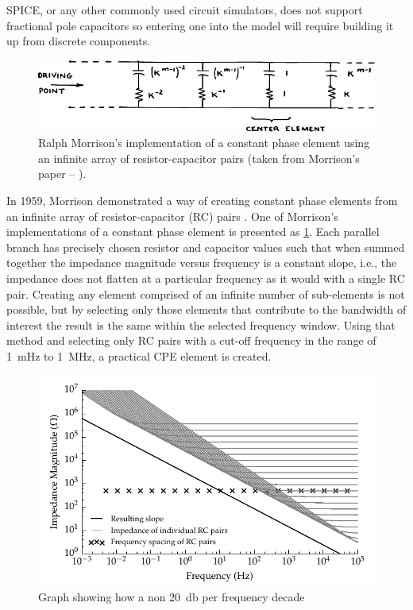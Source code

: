       SPICE, or any other commonly used circuit simulators, does not support fractional pole capacitors so entering one into the model will require building it up from discrete components.
      \begin{figure}[h]
        \centering
        \includegraphics{content/pt2/07-InterfaceModel/graphics/Morrison-RC}
        \caption{\label{graph:pt2-morrisonCPE}Ralph Morrison's implementation of a constant phase element using an infinite array of resistor-capacitor pairs (taken from Morrison's paper -- \cite{Morrison1959}).}
      \end{figure}
      In 1959, Morrison demonstrated a way of creating constant phase elements from an infinite array of resistor-capacitor (RC) pairs \cite{Morrison1959}.
      One of Morrison's implementations of a constant phase element is presented as \cref{graph:pt2-morrisonCPE}.
      Each parallel branch has precisely chosen resistor and capacitor values such that when summed together the impedance magnitude versus frequency is a constant slope, i.e., the impedance does not flatten at a particular frequency as it would with a single RC pair.
      Creating any element comprised of an infinite number of sub-elements is not possible, but by selecting only those elements that contribute to the bandwidth of interest the result is the same within the selected frequency window.
      Using that method and selecting only RC pairs with a cut-off frequency in the range of \SI{1}{\milli\hertz} to \SI{1}{\mega\hertz}, a practical CPE element is created.

      \begin{figure}
        \centering
        \includegraphics{content/pt2/07-InterfaceModel/graphics/graph_cpe_creation}
        \caption{\label{graph:pt2-cpe_creation}Graph showing how a non \SI{20}{\decibel} per frequency decade}
      \end{figure}

